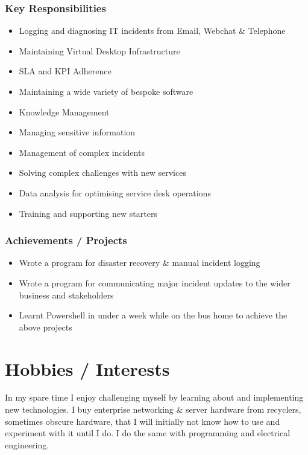 \documentclass{report}
\begin{document}
		\subsubsection*{Key Responsibilities}
			\begin{itemize}
				\setlength\itemsep{0pt}
				\item Logging and diagnosing IT incidents from Email, Webchat \& Telephone
				\item Maintaining Virtual Desktop Infrastructure
				\item SLA and KPI Adherence
				\item Maintaining a wide variety of bespoke software
				\item Knowledge Management
				\item Managing sensitive information
				\item Management of complex incidents
				\item Solving complex challenges with new services
				\item Data analysis for optimising service desk operations
				\item Training and supporting new starters
			\end{itemize}
	
		\subsubsection*{Achievements / Projects}
			\begin{itemize}
				\setlength\itemsep{0pt}
				\item Wrote a program for disaster recovery \& manual incident logging
				\item Wrote a program for communicating major incident updates to the wider business and stakeholders
				\item Learnt Powershell in under a week while on the bus home to achieve the above projects
			\end{itemize}
	
	\section*{Hobbies / Interests}
		In my spare time I enjoy challenging myself by learning about and implementing new technologies.
		I buy enterprise networking \& server hardware from recyclers, sometimes obscure hardware,
		that I will initially not know how to use and experiment with it until I do.
		I do the same with programming and electrical engineering.
	
\end{document}

